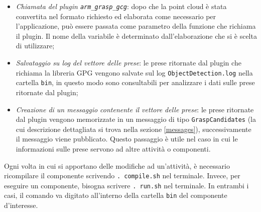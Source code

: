 \documentclass{report}
\begin{document}
\begin{itemize}
\item \textit{Chiamata del plugin \texttt{arm\_grasp\_gcg}}: dopo che la point cloud è stata convertita nel formato richiesto ed elaborata come necessario per l'applicazione, può essere passata come parametro della funzione che richiama il plugin. Il nome della variabile è determinato dall'elaborazione che si è scelta di utilizzare;
\item \textit{Salvataggio su log del vettore delle prese}: le prese ritornate dal plugin che richiama la libreria GPG vengono salvate sul log \texttt{ObjectDetection.log} nella cartella \texttt{bin}, in questo modo sono consultabili per analizzare i dati sulle prese ritornate dal plugin;
\item \textit{Creazione di un messaggio contenente il vettore delle prese}: le prese ritornate dal plugin vengono memorizzate in un messaggio di tipo \texttt{GraspCandidates} (la cui descrizione dettagliata si trova nella sezione \ref{messages}), successivamente il messaggio viene pubblicato. Questo passaggio è utile nel caso in cui le informazioni sulle prese servono ad altre attività o componenti. 
\end{itemize}
Ogni volta in cui si apportano delle modifiche ad un'attività, è necessario ricompilare il componente scrivendo \texttt{.~compile.sh} nel terminale. Invece, per eseguire un componente, bisogna scrivere \texttt{.~run.sh} nel terminale. In entrambi i casi, il comando va digitato all'interno della cartella \texttt{bin} del componente d'interesse.
\end{document}
